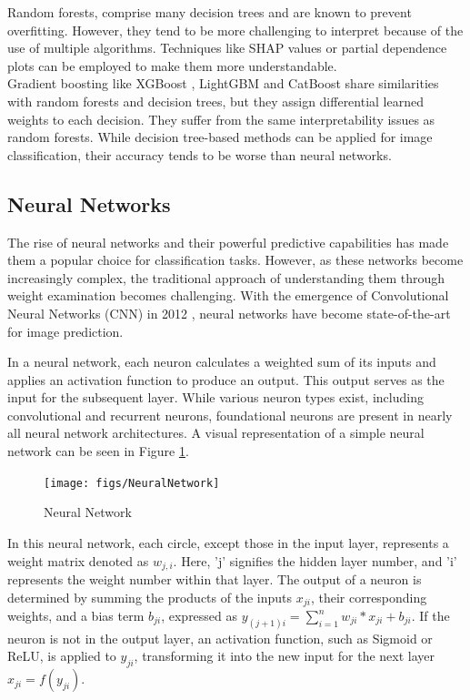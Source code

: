 Random forests\cite{ho1995random}, comprise many decision trees and are known to prevent overfitting. However, they tend to be more challenging to interpret because of the use of multiple algorithms. Techniques like SHAP values \cite{lundberg2017unified} or partial dependence plots \cite{PDP} can be employed to make them more understandable.
\\
Gradient boosting like XGBoost \cite{Chen_2016}, LightGBM \cite{Ke2017} and CatBoost \cite{prokhorenkova2019catboost} share similarities with random forests and decision trees, but they assign differential learned weights to each decision. They suffer from the same interpretability issues as random forests. While decision tree-based methods can be applied for image classification, their accuracy tends to be worse than neural networks.


\subsection{Neural Networks}

The rise of neural networks and their powerful predictive capabilities has made them a popular choice for classification tasks. However, as these networks become increasingly complex, the traditional approach of understanding them through weight examination becomes challenging. With the emergence of Convolutional Neural Networks (CNN) in 2012 \cite{krizhevsky2012nn}, neural networks have become state-of-the-art for image prediction.

In a neural network, each neuron calculates a weighted sum of its inputs and applies an activation function to produce an output. This output serves as the input for the subsequent layer. While various neuron types exist, including convolutional and recurrent neurons, foundational neurons are present in nearly all neural network architectures. A visual representation of a simple neural network can be seen in Figure \ref{fig:Neural_Network}.

\begin{figure}[h!]
	\centering
	\texttt{[image: figs/NeuralNetwork]}
	\caption[Neural Network]{Neural Network} 
	\label{fig:Neural_Network}
\end{figure}

In this neural network, each circle, except those in the input layer, represents a weight matrix denoted as $w_{j,i}$. Here, 'j' signifies the hidden layer number, and 'i' represents the weight number within that layer. The output of a neuron is determined by summing the products of the inputs $x_{ji}$, their corresponding weights, and a bias term $b_{ji}$, expressed as $y_{(j+1)i} = \sum_{i=1}^{n} w_{ji} \ast x_{ji} + b_{ji}$. If the neuron is not in the output layer, an activation function, such as Sigmoid or ReLU, is applied to $y_{ji}$, transforming it into the new input for the next layer $x_{ji} = f(y_{ji})$. 

